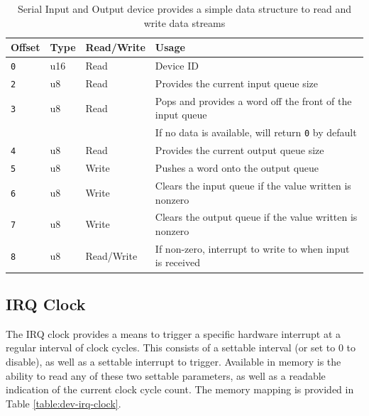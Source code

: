 \documentclass{article}
\begin{document}
\begin{table}[h!]
    \centering
    \begin{tabular}{l|lll}
        \hline
        Offset & Type & Read/Write & Usage \\
        \hline
        \texttt{0} & u16 & Read & Device ID \\
        \texttt{2} & u8 & Read & Provides the current input queue size \\
        \texttt{3} & u8 & Read & Pops and provides a word off the front of the input queue \\
        & & & If no data is available, will return \texttt{0} by default \\
        \texttt{4} & u8 & Read & Provides the current output queue size \\
        \texttt{5} & u8 & Write & Pushes a word onto the output queue \\
        \texttt{6} & u8 & Write & Clears the input queue if the value written is nonzero \\
        \texttt{7} & u8 & Write & Clears the output queue if the value written is nonzero \\
        \texttt{8} & u8 & Read/Write & If non-zero, interrupt to write to when input is received \\
        \hline
    \end{tabular}
    \caption{Serial Input and Output device provides a simple data structure to read and write data streams}
    \label{table:dev-serial-io}
\end{table}

\subsection{IRQ Clock}
\label{sec:dev-irq-clock}

The IRQ clock provides a means to trigger a specific hardware interrupt at a regular interval of clock cycles. This consists of a settable interval (or set to 0 to disable), as well as a settable interrupt to trigger. Available in memory is the ability to read any of these two settable parameters, as well as a readable indication of the current clock cycle count. The memory mapping is provided in Table \ref{table:dev-irq-clock}.
\end{document}
